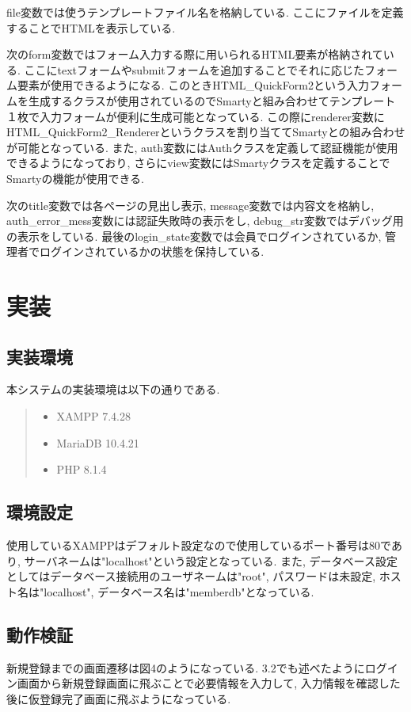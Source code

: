 \documentclass[submit,techrep]{ipsj}
\begin{document}
file変数では使うテンプレートファイル名を格納している. ここにファイルを定義することでHTMLを表示している. 

次のform変数ではフォーム入力する際に用いられるHTML要素が格納されている. ここにtextフォームやsubmitフォームを追加することでそれに応じたフォーム要素が使用できるようになる. このときHTML\_QuickForm2という入力フォームを生成するクラスが使用されているのでSmartyと組み合わせてテンプレート１枚で入力フォームが便利に生成可能となっている. 
この際にrenderer変数にHTML\_QuickForm2\_Rendererというクラスを割り当ててSmartyとの組み合わせが可能となっている.  また, auth変数にはAuthクラスを定義して認証機能が使用できるようになっており, さらにview変数にはSmartyクラスを定義することでSmartyの機能が使用できる. 

次のtitle変数では各ページの見出し表示, message変数では内容文を格納し, auth\_error\_mess変数には認証失敗時の表示をし, debug\_str変数ではデバッグ用の表示をしている. 最後のlogin\_state変数では会員でログインされているか, 管理者でログインされているかの状態を保持している. 

\section{実装}
\subsection{実装環境}
本システムの実装環境は以下の通りである. 

\begin{quote}
 \begin{itemize}
 \item XAMPP 7.4.28
 \item MariaDB 10.4.21
 \item PHP 8.1.4
 \end{itemize}
\end{quote}

\subsection{環境設定}
使用しているXAMPPはデフォルト設定なので使用しているポート番号は80であり, サーバネームは"localhost"という設定となっている. また, データベース設定としてはデータベース接続用のユーザネームは"root", パスワードは未設定, ホスト名は"localhost", データベース名は"memberdb"となっている. 

\subsection{動作検証}
新規登録までの画面遷移は図4のようになっている. 3.2でも述べたようにログイン画面から新規登録画面に飛ぶことで必要情報を入力して, 入力情報を確認した後に仮登録完了画面に飛ぶようになっている. 
\end{document}
